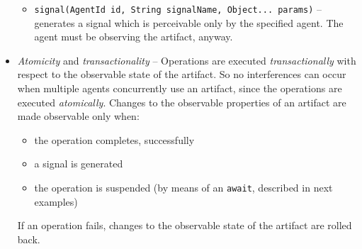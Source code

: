 \documentclass[11pt]{report}
\newcommand\code[1]{{\small{\mbox{\texttt{{#1}}}}}}
\begin{document}
\begin{itemize}
\begin{itemize}
%
\item \code{signal(AgentId id, String signalName, Object... params)} -- generates a signal which is perceivable only by the specified agent.  
%
The agent must be observing the artifact, anyway.
%
\end{itemize}
%
\item \emph{Atomicity} and \emph{transactionality} -- Operations are executed \emph{transactionally} with respect to the observable state of the artifact.
%
 So no interferences can occur when multiple agents concurrently use an artifact, since the operations are executed \emph{atomically}.
%
Changes to the observable properties of an artifact are made observable only when:
%
\begin{itemize}
\item the operation completes, successfully 
\item a signal is generated
\item the operation is suspended (by means of an \code{await}, described in next examples)
\end{itemize}
%
If an operation fails, changes to the observable state of the artifact are rolled back. 


\end{itemize}
\end{document}
